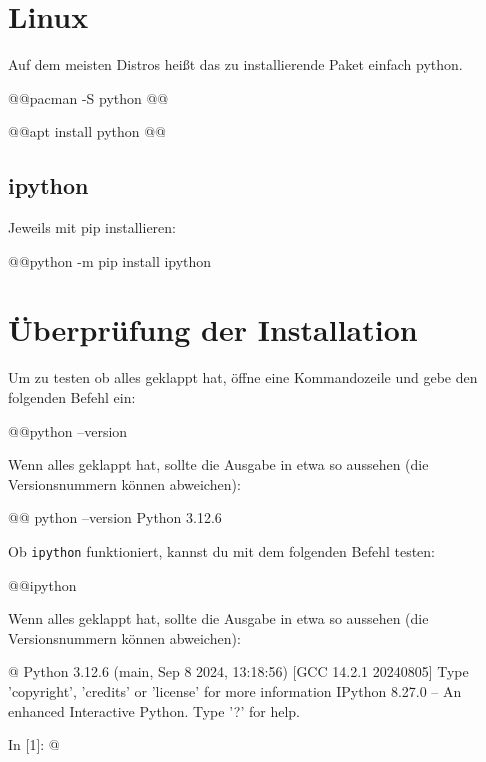 \section*{Linux}
Auf dem meisten Distros heißt das zu installierende Paket einfach {\ttfamily python}.
\begin{commandshell}[][minted language=text]
    @\shellprefix{}@pacman -S python @@
\end{commandshell}

\begin{commandshell}[][minted language=text]
    @\shellprefix{}@apt install python @@
\end{commandshell}

\subsection*{ipython}
Jeweils mit pip installieren:
\begin{commandshell}[][minted language=text]
    @\shellprefix{}@python -m pip install ipython
\end{commandshell}

\section*{Überprüfung der Installation}\label{sec:check}
Um zu testen ob alles geklappt hat, öffne eine Kommandozeile und gebe den folgenden Befehl ein:
\begin{commandshell}
    @\shellprefix{}@python --version
\end{commandshell}

Wenn alles geklappt hat, sollte die Ausgabe in etwa so aussehen (die Versionsnummern können abweichen):
\begin{commandshell}[][]
    @\shellprefix{}@ python --version
    Python 3.12.6
\end{commandshell}

Ob \texttt{ipython} funktioniert, kannst du mit dem folgenden Befehl testen:
\begin{commandshell}
    @\shellprefix{}@ipython
\end{commandshell}
Wenn alles geklappt hat, sollte die Ausgabe in etwa so aussehen (die Versionsnummern können abweichen):
\begin{commandshell}[][minted language=text]
    @\shellprefix@ipython
    Python 3.12.6 (main, Sep  8 2024, 13:18:56) [GCC 14.2.1 20240805]
    Type 'copyright', 'credits' or 'license' for more information
    IPython 8.27.0 -- An enhanced Interactive Python. Type '?' for help.

    In [1]: @\shellcursor@
\end{commandshell}


